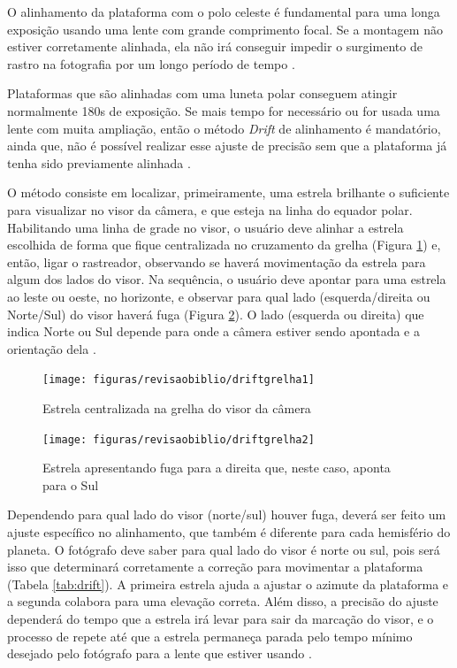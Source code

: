 O alinhamento da plataforma com o polo celeste é fundamental para uma longa exposição usando uma lente com grande comprimento focal. Se a montagem não estiver corretamente alinhada, ela não irá conseguir impedir o surgimento de rastro na fotografia por um longo período de tempo \cite{book:bbcsky}.  

Plataformas que são alinhadas com uma luneta polar conseguem atingir normalmente 180s de exposição. Se mais tempo for necessário ou for usada uma lente com muita ampliação, então o método \textit{Drift} de alinhamento é mandatório, ainda que, não é possível realizar esse ajuste de precisão sem que a plataforma já tenha sido previamente alinhada \cite{book:bbcsky}. 

O método consiste em localizar, primeiramente, uma estrela brilhante o suficiente para visualizar no visor da câmera, e que esteja na linha do equador polar. Habilitando uma linha de grade no visor, o usuário deve alinhar a estrela escolhida de forma que fique centralizada no cruzamento da grelha (Figura \ref{fig:driftgrelha1}) e, então, ligar o rastreador, observando se haverá movimentação da estrela para algum dos lados do visor. Na sequência, o usuário deve apontar para uma estrela ao leste ou oeste, no horizonte, e observar para qual lado (esquerda/direita ou Norte/Sul) do visor haverá fuga (Figura \ref{fig:driftgrelha2}). O lado (esquerda ou direita) que indica Norte ou Sul depende para onde a câmera estiver sendo apontada e a orientação dela \cite{book:bbcsky}.

\begin{figure}[hbt]
	\centering
	\caption{Estrela centralizada na grelha do visor da câmera}
	\texttt{[image: figuras/revisaobiblio/driftgrelha1]}
	\label{fig:driftgrelha1}
\end{figure}

\begin{figure}[hbt]
	\centering
	\caption{Estrela apresentando fuga para a direita que, neste caso, aponta para o Sul}
	\texttt{[image: figuras/revisaobiblio/driftgrelha2]}
	\label{fig:driftgrelha2}
\end{figure}

Dependendo para qual lado do visor (norte/sul) houver fuga, deverá ser feito um ajuste específico no alinhamento, que também é diferente para cada hemisfério do planeta. O fotógrafo deve saber para qual lado do visor é norte ou sul, pois será isso que determinará corretamente a correção para movimentar a plataforma (Tabela \ref{tab:drift}). A primeira estrela ajuda a ajustar o azimute da plataforma e a segunda colabora para uma elevação correta. Além disso, a precisão do ajuste dependerá do tempo que a estrela irá levar para sair da marcação do visor, e o processo de repete até que a estrela permaneça parada pelo tempo mínimo desejado pelo fotógrafo para a lente que estiver usando \cite{book:bbcsky}. 

